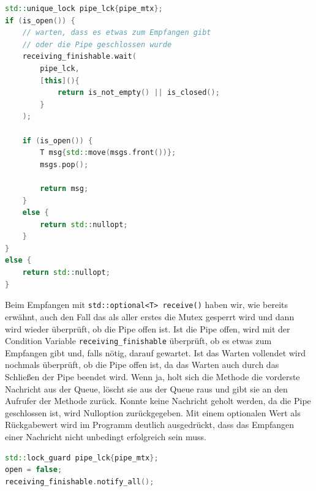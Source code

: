 \noindent\hrulefill\par
\begin{minipage}{\linewidth}
\begin{lstlisting}[language=C++, caption=Empfangen einer Nachricht ... std::optional<T> receive()]
std::unique_lock pipe_lck{pipe_mtx};
if (is_open()) {
    // warten, dass es etwas zum Empfangen gibt
    // oder die Pipe geschlossen wurde
    receiving_finishable.wait(
        pipe_lck, 
        [this](){ 
            return is_not_empty() || is_closed(); 
        }
    );

    if (is_open()) {
        T msg{std::move(msgs.front())};
        msgs.pop();

        return msg;
    }
    else {
        return std::nullopt;
    }
}
else {
    return std::nullopt;
}
\end{lstlisting}
\end{minipage}

Beim Empfangen mit \verb|std::optional<T> receive()| haben wir, wie bereits erwähnt, auch den Fall das als aller erstes die Mutex gesperrt wird und dann wird wieder überprüft, 
ob die Pipe offen ist. Ist die Pipe offen, wird mit der Condition Variable \verb|receiving_finishable| überprüft, ob es etwas zum Empfangen gibt und, falls nötig, darauf gewartet.
Ist das Warten vollendet wird nochmals überprüft, ob die Pipe offen ist, da das Warten auch durch das Schließen der Pipe beendet wird. Wenn ja, holt sich die Methode
die vorderste Nachricht aus der Queue, löscht sie aus der Queue raus und gibt sie an den Aufrufer der Methode zurück. Konnte keine Nachricht geholt werden, da die
Pipe geschlossen ist, wird Nulloption zurückgegeben. Mit einem optionalen Wert als Rückgabewert wird im Programm deutlich ausgedrückt, dass das Empfangen einer Nachricht
nicht unbedingt erfolgreich sein muss.\\

\noindent\hrulefill\par
\begin{minipage}{\linewidth}
\begin{lstlisting}[language=C++, caption=Schließen der Pipe ... void close()]
std::lock_guard pipe_lck{pipe_mtx};
open = false;
receiving_finishable.notify_all();
\end{lstlisting}
\end{minipage}

